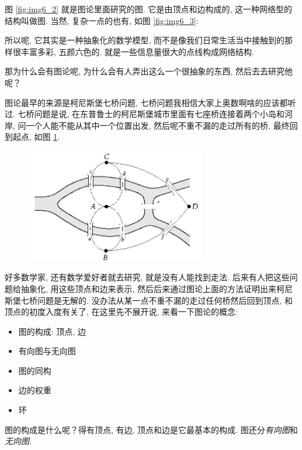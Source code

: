 图 \ref{fig:img6_2} 就是图论里面研究的图. 它是由顶点和边构成的, 这一种网络型的结构叫做图. 当然, 复杂一点的也有, 如图 \ref{fig:img6_3}: 

所以呢, 它其实是一种抽象化的数学模型, 而不是像我们日常生活当中接触到的那样很丰富多彩, 五颜六色的. 就是一些信息量很大的点线构成网络结构. 

那为什么会有图论呢, 为什么会有人弄出这么一个很抽象的东西, 然后去去研究他呢？

图论最早的来源是柯尼斯堡七桥问题, 七桥问题我相信大家上奥数啊啥的应该都听过. 七桥问题是说, 在东普鲁士的柯尼斯堡城市里面有七座桥连接着两个小岛和河岸, 问一个人能不能从其中一个位置出发, 然后呢不重不漏的走过所有的桥, 最终回到起点, 如图 \ref{fig:img6_4}. 

\begin{figure}[ht]
  \centering
  \includegraphics[width=0.7\textwidth]{asset/9d22dca2-380f-4646-8eca-179a95ce9c95.png}
  \caption{}
  \label{fig:img6_4}
\end{figure}

好多数学家, 还有数学爱好者就去研究, 就是没有人能找到走法. 后来有人把这些问题给抽象化, 用这些顶点和边来表示, 然后后来通过图论上面的方法证明出来柯尼斯堡七桥问题是无解的. 没办法从某一点不重不漏的走过任何桥然后回到顶点, 和顶点的初度入度有关了, 在这里先不展开说, 来看一下图论的概念: 

\begin{itemize}
  \item 图的构成: 顶点, 边
  \item 有向图与无向图
  \item 图的同构
  \item 边的权重
  \item 环
\end{itemize}

图的构成是什么呢？得有顶点, 有边, 顶点和边是它最基本的构成. 图还分\textit{有向图}和\textit{无向图}. 

